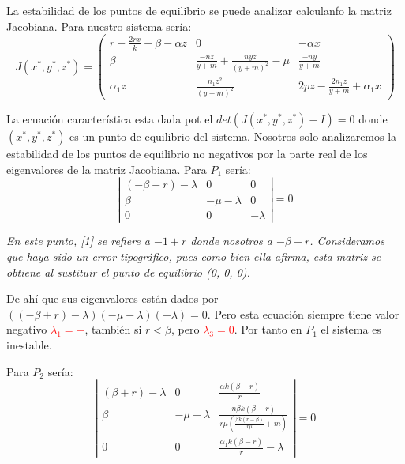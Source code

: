 \documentclass{wscpaperproc}
\theoremstyle{wsc}
\begin{document}
La estabilidad de los puntos de equilibrio se puede analizar calculanfo la matriz Jacobiana. Para nuestro sistema sería:
$$ J(x^*, y^*, z^*) = \left(
	\begin{array}{ccc}
			r-\frac{2rx}{k}-\beta-\alpha z & 0                                       & -\alpha x                       \\
			\beta                          & \frac{-nz}{y+m}+\frac{nyz}{(y+m)^2}-\mu & \frac{-ny}{y+m}                 \\
			\alpha_1z                      & \frac{n_1z^2}{(y+m)^2}                  & 2pz-\frac{2n_1z}{y+m}+\alpha_1x
		\end{array}
	\right)$$

La ecuación característica esta dada pot el $det(J(x^*, y^*, z^*)-I)=0$ donde $(x^*, y^*, z^*)$ es un punto de equilibrio del sistema.
Nosotros solo analizaremos la estabilidad de los puntos de equilibrio no negativos por la parte real de los eigenvalores de la matriz Jacobiana.
\vspace*{0.5cm}
Para $P_1$ sería:
$$\left|
	\begin{array}{ccc}
		(-\beta+r)-\lambda & 0            & 0        \\
		\beta              & -\mu-\lambda & 0        \\
		0                  & 0            & -\lambda
	\end{array}
	\right| =0$$

{\it En este punto, [1] se refiere a $-1+r$ donde nosotros a $-\beta+r$. Consideramos que haya sido un error tipográfico, pues como bien ella
		afirma, esta matriz se obtiene al sustituir el punto de equilibrio (0, 0, 0).}


De ahí que sus eigenvalores están dados por $((-\beta+r)-\lambda)(-\mu-\lambda)(-\lambda)=0$. Pero esta ecuación siempre tiene valor negativo
\textcolor{red}{$\lambda_1=-$}, también si $r<\beta$, pero \textcolor{red}{$\lambda_3=0$}. Por tanto en $P_1$ el sistema es inestable.

\vspace*{0.5cm}

Para $P_2$ sería:
$$\left|
	\begin{array}{ccc}
		(\beta+r)-\lambda & 0            & \frac{\alpha k(\beta-r)}{r}                                      \\
		\beta             & -\mu-\lambda & \frac{n\beta k(\beta-r)}{r\mu (\frac{\beta k(r-\beta)}{r\mu}+m)} \\
		0                 & 0            & \frac{\alpha_1 k(\beta-r)}{r}-\lambda
	\end{array}
	\right| =0$$
\end{document}
